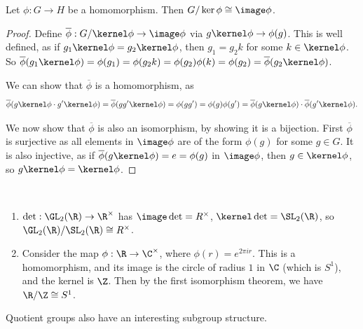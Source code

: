 \begin{theorem}
	Let $\phi : G \rightarrow H$ be a homomorphism. Then $G/\ker \phi \cong \image \phi$.
\end{theorem}
\begin{proof}
	Define $\overline{\phi} : G/\kernel \phi \rightarrow \image \phi$ via $g \kernel \phi \rightarrow \phi(g)$.
	This is well defined, as if $g_1 \kernel \phi = g_2 \kernel \phi$, then $g_1 = g_2k$ for some $k \in \kernel \phi$. So $\overline{\phi}(g_1 \kernel \phi) = \phi(g_1) = \phi(g_2 k) = \phi(g_2) \phi(k) = \phi(g_2) = \overline{\phi}(g_2 \kernel \phi)$.

	We can show that $\overline{\phi}$ is a homomorphism, as 
	$$
	\overline{\phi}(g \kernel \phi \cdot g' \kernel \phi) = \overline{\phi}(g g' \kernel \phi) = \phi(g g') = \phi(g) \phi(g') = \overline{\phi}(g \kernel \phi) \cdot \overline{\phi}(g' \kernel \phi).
	$$

	We now show that $\overline{\phi}$ is also an isomorphism, by showing it is a bijection. First $\overline{\phi}$ is surjective as all elements in $\image \phi$ are of the form $\phi(g)$ for some $g \in G$. It is also injective, as if $\overline{\phi}(g \kernel \phi) = e = \phi(g)$ in $\image \phi$, then $g \in \kernel \phi$, so $g \kernel \phi = \kernel \phi$.
\end{proof}

\begin{example}~
    \vspace*{-1.5\baselineskip}
\begin{enumerate}[label=(\roman*)]
    \item $\det : \GL_2(\R) \rightarrow \R^\times$ has $\image \det = R^\times$, $\kernel \det = \SL_2(\R)$, so $\GL_2(\R) / \SL_2(\R) \cong R^\times$.
    \item Consider the map $\phi : \R \rightarrow \C^\times$, where $\phi(r) = e^{2 \pi i r}$. This is a homomorphism, and its image is the circle of radius $1$ in $\C$ (which is $S^1$), and the kernel is $\Z$. Then by the first isomorphism theorem, we have $\R/\Z \cong S^1$.
\end{enumerate}
\end{example}

Quotient groups also have an interesting subgroup structure.

